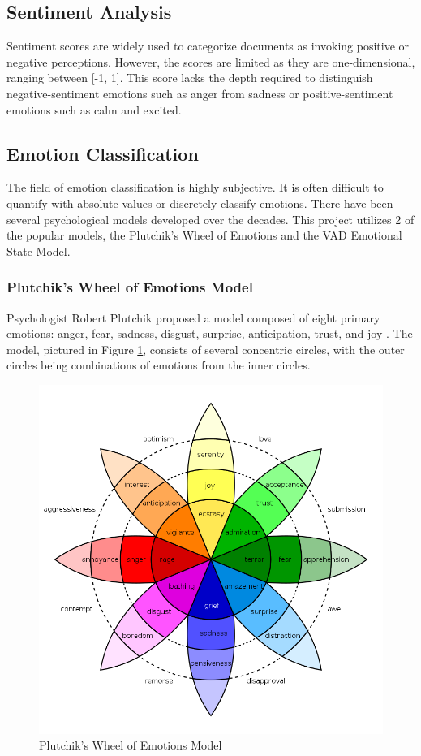 \documentclass[11pt]{article}
\begin{document}
\subsection{Sentiment Analysis}

Sentiment scores are widely used to categorize documents as invoking positive or negative perceptions. However, the scores are limited as they are one-dimensional, ranging between [-1, 1]. This score lacks the depth required to distinguish negative-sentiment emotions such as anger from sadness or positive-sentiment emotions such as calm and excited.

\subsection{Emotion Classification}

The field of emotion classification is highly subjective. It is often difficult to quantify with absolute values or discretely classify emotions. There have been several psychological models developed over the decades. This project utilizes 2 of the popular models, the Plutchik's Wheel of Emotions and the VAD Emotional State Model.

\subsubsection{Plutchik's Wheel of Emotions Model}

Psychologist Robert Plutchik proposed a model composed of eight primary emotions: anger, fear, sadness, disgust, surprise, anticipation, trust, and joy \cite{wheel}. The model, pictured in Figure \ref{fig:wheel}, consists of several concentric circles, with the outer circles being combinations of emotions from the inner circles.

\begin{figure}[!ht]
  \includegraphics[scale=0.4]{../statics/wheel.png}
  \centering
  \caption{Plutchik's Wheel of Emotions Model}
  \label{fig:wheel}
\end{figure}
\end{document}

